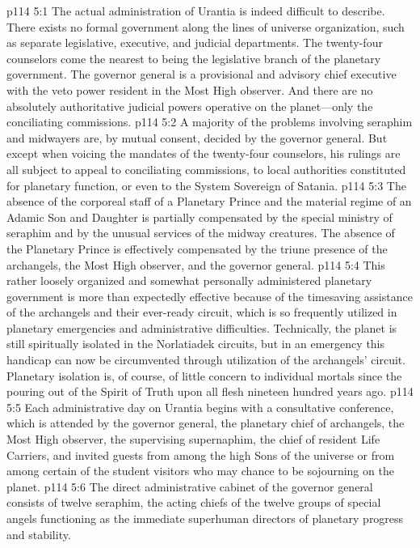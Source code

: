 \vs p114 5:1 The actual administration of Urantia is indeed difficult to describe. There exists no formal government along the lines of universe organization, such as separate legislative, executive, and judicial departments. The twenty\hyp{}four counselors come the nearest to being the legislative branch of the planetary government. The governor general is a provisional and advisory chief executive with the veto power resident in the Most High observer. And there are no absolutely authoritative judicial powers operative on the planet---only the conciliating commissions.
\vs p114 5:2 A majority of the problems involving seraphim and midwayers are, by mutual consent, decided by the governor general. But except when voicing the mandates of the twenty\hyp{}four counselors, his rulings are all subject to appeal to conciliating commissions, to local authorities constituted for planetary function, or even to the System Sovereign of Satania.
\vs p114 5:3 The absence of the corporeal staff of a Planetary Prince and the material regime of an Adamic Son and Daughter is partially compensated by the special ministry of seraphim and by the unusual services of the midway creatures. The absence of the Planetary Prince is effectively compensated by the triune presence of the archangels, the Most High observer, and the governor general.
\vs p114 5:4 This rather loosely organized and somewhat personally administered planetary government is more than expectedly effective because of the timesaving assistance of the archangels and their ever\hyp{}ready circuit, which is so frequently utilized in planetary emergencies and administrative difficulties. Technically, the planet is still spiritually isolated in the Norlatiadek circuits, but in an emergency this handicap can now be circumvented through utilization of the archangels’ circuit. Planetary isolation is, of course, of little concern to individual mortals since the pouring out of the Spirit of Truth upon all flesh nineteen hundred years ago.
\pc \vs p114 5:5 Each administrative day on Urantia begins with a consultative conference, which is attended by the governor general, the planetary chief of archangels, the Most High observer, the supervising supernaphim, the chief of resident Life Carriers, and invited guests from among the high Sons of the universe or from among certain of the student visitors who may chance to be sojourning on the planet.
\vs p114 5:6 The direct administrative cabinet of the governor general consists of twelve seraphim, the acting chiefs of the twelve groups of special angels functioning as the immediate superhuman directors of planetary progress and stability.
